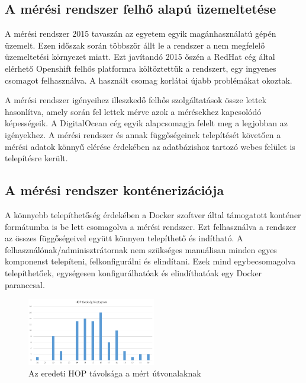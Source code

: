 \subsection*{A mérési rendszer felhő alapú üzemeltetése}
A mérési rendszer 2015 tavaszán az egyetem egyik magánhasználatú gépén üzemelt. Ezen időszak során többször állt le a rendszer a nem megfelelő üzemeltetési környezet miatt. Ezt javítandó 2015 őszén a RedHat cég által elérhető Openshift felhős platformra költöztettük a rendszert, egy ingyenes csomagot felhasználva. A használt csomag korlátai újabb problémákat okoztak.

A mérési rendszer igényeihez illeszkedő felhős szolgáltatások össze lettek hasonlítva, amely során fel lettek mérve azok a mérésekhez kapcsolódó képességeik. A DigitalOcean cég egyik alapcsomagja felelt meg a legjobban az igényekhez.
A mérési rendszer és annak függőségeinek telepítését követően a mérési adatok könnyű elérése érdekében az adatbázishoz tartozó webes felület is telepítésre került.

\subsection*{A mérési rendszer konténerizációja}
A könnyebb telepíthetőség érdekében a Docker szoftver által támogatott konténer formátumba is be lett csomagolva a mérési rendszer. Ezt felhasználva a rendszer az összes függőségeivel együtt könnyen telepíthető és indítható.
A felhasználónak/adminisztrátornak nem szükséges manuálisan minden egyes komponenst telepíteni, felkonfigurálni és elindítani. Ezek mind egybecsomagolva telepíthetőek, egységesen konfigurálhatóak és elindíthatóak egy Docker paranccsal.

\begin{figure}[!ht]
	\centering
	\includegraphics[width=0.5\textwidth, keepaspectratio]{figures/hop-hist.png}
	\caption{Az eredeti HOP távolsága a mért útvonalaknak}
	\label{fig:hop-hist}
\end{figure}












